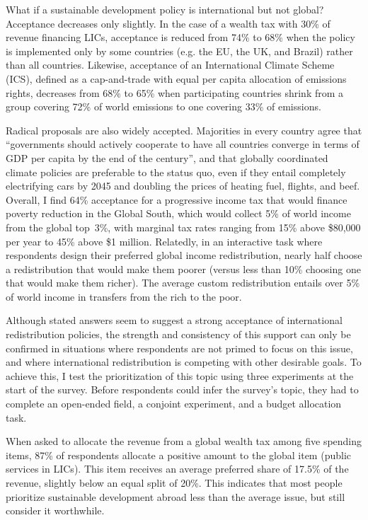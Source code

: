 \documentclass[12pt,english]{article}
\begin{document}
\begin{bibunit}
What if a sustainable development policy is international but not global? Acceptance decreases only slightly. In the case of a wealth tax with 30\% of revenue financing LICs, acceptance is reduced from 74\% to 68\% when the policy is implemented only by some countries (e.g. the EU, the UK, and Brazil) rather than all countries. Likewise, acceptance of an International Climate Scheme (ICS), defined as a cap-and-trade with equal per capita allocation of emissions rights, decreases from 68\% to 65\% when participating countries shrink from a group covering 72\% of world emissions to one covering 33\% of emissions.

Radical proposals are also widely accepted. Majorities in every country agree that ``governments should actively cooperate to have all countries converge in terms of GDP per capita by the end of the century'', and that globally coordinated climate policies are preferable to the status quo, even if they entail completely electrifying cars by 2045 and doubling the prices of heating fuel, flights, and beef. Overall, I find 64\% acceptance for a progressive income tax that would finance poverty reduction in the Global South, which would collect 5\% of world income from the global top~3\%, with marginal tax rates ranging from 15\% above \$80,000 per year to 45\% above \$1 million. Relatedly, in an interactive task where respondents design their preferred global income redistribution, nearly half choose a redistribution that would make them poorer (versus less than 10\% choosing one that would make them richer). The average custom redistribution entails over 5\% of world income in transfers from the rich to the poor. 

Although stated answers seem to suggest a strong acceptance of international redistribution policies, the strength and consistency of this support can only be confirmed in situations where respondents are not primed to focus on this issue, and where international redistribution is competing with other desirable goals. To achieve this, I test the prioritization of this topic using three experiments at the start of the survey. 
Before respondents could infer the survey's topic, they had to complete an open-ended field, a conjoint experiment, and a budget allocation task. 

When asked to allocate the revenue from a %
global wealth tax among five spending items, 87\% of respondents allocate a positive amount to the global item (public services in LICs). This item receives an average preferred share of 17.5\% of the revenue, slightly below an equal split of 20\%. %
This indicates that most people prioritize sustainable development abroad less than the average issue, but still consider it worthwhile. %


\end{bibunit}
\end{document}
